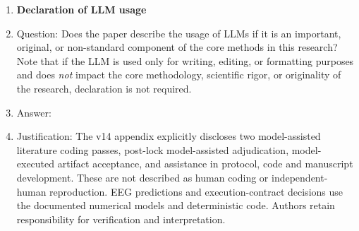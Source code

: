 \begin{enumerate}
\item {\bf Declaration of LLM usage}
    \item[] Question: Does the paper describe the usage of LLMs if it is an important, original, or non-standard component of the core methods in this research? Note that if the LLM is used only for writing, editing, or formatting purposes and does \emph{not} impact the core methodology, scientific rigor, or originality of the research, declaration is not required.
    \item[] Answer: \answerYes{}
    \item[] Justification: The v14 appendix explicitly discloses two model-assisted literature coding passes, post-lock model-assisted adjudication, model-executed artifact acceptance, and assistance in protocol, code and manuscript development. These are not described as human coding or independent-human reproduction. EEG predictions and execution-contract decisions use the documented numerical models and deterministic code. Authors retain responsibility for verification and interpretation.

\end{enumerate}
